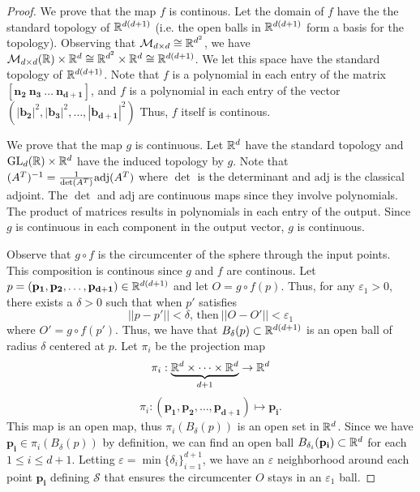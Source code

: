 \documentclass[letterpaper,titlepage]{article}
\begin{document}
\begin{proof}
        We prove that the map $f$ is continous. Let the domain of $f$ have the the standard topology of $\mathbb{R}^{d(d+1)}$ (i.e. the open balls in $\mathbb{R}^{d(d+1)}$ form a basis for the topology). Observing that $\mathcal{M}_{d\times d} \cong \mathbb{R}^{d^2}$, we have $\mathcal{M}_{d\times d}(\mathbb{R})\times \mathbb{R}^d \cong \mathbb{R}^{d^2}\times \mathbb{R}^d \cong \mathbb{R}^{d(d+1)}$. We let this space have the standard topology of $\mathbb{R}^{d(d+1)}$. Note that $f$ is a polynomial in each entry of the matrix $\left[\mathbf{n_2}\ \mathbf{n_3}\ \dots\ \mathbf{n_{d+1}}\right]$, and $f$ is a polynomial in each entry of the vector $(\left|\mathbf{b_2}\right|^2, \left|\mathbf{b_3}\right|^2,\dots,\left|\mathbf{b_{d+1}}\right|^2)$ Thus, $f$ itself is continous.

        We prove that the map $g$ is continuous. Let $\mathbb{R}^d$ have the standard topology and $\text{GL}_d(\mathbb{R})\times \mathbb{R}^d$ have the induced topology by $g$. Note that $(A^T)^{-1}=\frac{1}{\det(A^T)}\text{adj}(A^T)$ where $\det$ is the determinant and $\text{adj}$ is the classical adjoint. The $\det$ and $\text{adj}$ are continuous maps since they involve polynomials. The product of matrices results in polynomials in each entry of the output. Since $g$ is continuous in each component in the output vector, $g$ is continuous.
        
        Observe that $g \circ f$ is the circumcenter of the sphere through the input points. This composition is continous since $g$ and $f$ are continous. Let $p = (\mathbf{p_1},\mathbf{p_2},\dots,\mathbf{p_{d+1}}) \in \mathbb{R}^{d(d+1)}$ and let $O=g \circ f(p)$. Thus, for any $\varepsilon_1>0$, there exists a $\delta>0$ such that when $p'$ satisfies $$||p-p'|| < \delta \text{, then}\ ||O-O'|| < \varepsilon_1$$
        where $O'=g \circ f(p').$ Thus, we have that $B_\delta(p) \subset \mathbb{R}^{d(d+1)}$ is an open ball of radius $\delta$ centered at $p$. Let $\pi_i$ be the projection map
        $$\pi_i: \underbrace{\mathbb{R}^d \times \dots \times \mathbb{R}^d}_{d+1} \to \mathbb{R}^d$$
        $$\pi_i: (\mathbf{p_1},\mathbf{p_2},\dots,\mathbf{p_{d+1}}) \mapsto \mathbf{p_i}.$$
        This map is an open map, thus $\pi_i(B_\delta(p))$ is an open set in $\mathbb{R}^d$. Since we have $\mathbf{p_i} \in \pi_i(B_\delta(p))$ by definition, we can find an open ball $B_{\delta_i}(\mathbf{p_i}) \subset \mathbb{R}^d$ for each $1\leq i \leq d+1$. Letting $\varepsilon = \min\{\delta_i\}_{i=1}^{d+1}$, we have an $\varepsilon$ neighborhood around each point $\mathbf{p_i}$ defining $\mathcal{S}$ that ensures the circumcenter $O$ stays in an $\varepsilon_1$ ball.

    \end{proof}
    
\end{document}

